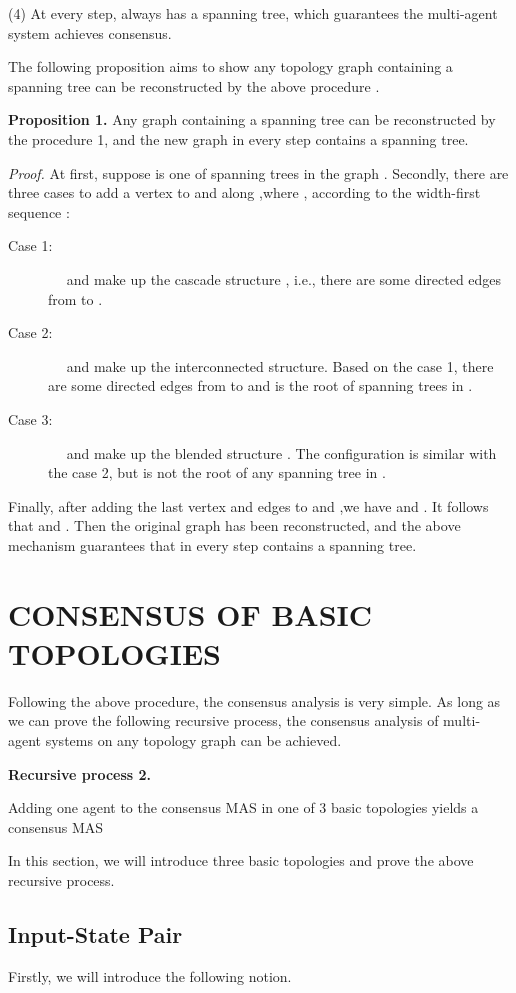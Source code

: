 \documentclass[english]{cccconf}
\begin{document}
{(4) At every step,   always has a spanning tree, which guarantees the multi-agent system achieves consensus.

The following proposition aims to  show any topology graph containing a spanning tree can be reconstructed by the above  procedure .

\textbf{Proposition 1.}  Any graph containing a spanning tree can be reconstructed by the procedure 1, and the new graph in every step contains a spanning tree.

\emph{Proof. }At first, suppose  is one of  spanning trees in the graph . Secondly, there are three cases to add a vertex   to  and  along   ,where  , according to the width-first sequence :

\begin{description}
  \item[Case 1:]~~ and  make up the cascade structure , i.e., there are some directed edges from    to  .
  \item[Case 2:]~~ and   make up the interconnected structure. Based on the case 1, there are some directed edges from   to   and    is the root of spanning trees in .
  \item[Case 3:]~~ and    make up the blended structure . The configuration is similar with the case 2, but    is not the root of  any spanning tree in .
\end{description}
 Finally, after adding the last vertex  and edges to  and   ,we have    and  . It follows that  and . Then the original graph has been reconstructed, and the above mechanism  guarantees that   in every step contains a spanning tree. 


\section{CONSENSUS OF BASIC TOPOLOGIES}

Following the above procedure, the consensus analysis is very simple. As long as we can prove the following recursive process, the consensus analysis of  multi-agent systems on any topology graph can be achieved.

{\textbf{Recursive process 2.}

{Adding} one agent to the consensus MAS  {in} one of 3 basic topologies  {yields} a consensus  MAS 


In this section, we will introduce three basic topologies and prove the above recursive process.

\subsection{Input-State Pair}
Firstly, we will introduce the following notion.

}}
\end{document}
